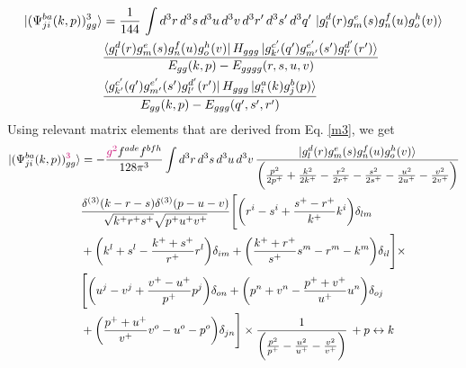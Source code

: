 \documentclass[a4paper,11pt]{article}
\begin{document}
\begin{figure}[htbp]
    \centering
\end{figure}
\begin{align}
     \ket{(\Psi^{ba}_{ji}(k,p))^{3}_{gg}} & =  \frac{1}{144}\, \int d^{3}r\, d^{3}s\, d^{3}u\, d^{3}v \, d^{3}r^{\prime}\, d^{3}s^{\prime} \, d^{3}q^{\prime}\, \ket{g^{d}_{l}(r)g^{e}_{m}(s)g^{f}_{n}(u)g^{h}_{o}(v)}\notag \\ & \frac{\bra{g^{d}_{l}(r)g^{e}_{m}(s)g^{f}_{n}(u)g^{h}_{o}(v)}H_{ggg}\ket{g^{c^{\prime}}_{k^{\prime}}(q^{\prime})g^{e^{\prime}}_{m^{\prime}}(s^{\prime})g^{d^{\prime}}_{l^{\prime}}(r^{\prime})}}{E_{gg}(k,p)-E_{gggg}(r,s,u,v)}\notag \\ &  \frac{\bra{g^{c^{\prime}}_{k^{\prime}}(q^{\prime})g^{e^{\prime}}_{m^{\prime}}(s^{\prime})g^{d^{\prime}}_{l^{\prime}}(r^{\prime})}H_{ggg}\ket{g^{a}_{i}(k)g^{b}_{j}(p)}}{E_{gg}(k,p)-E_{ggg}(q^{\prime},s^{\prime},r^{\prime})}
\end{align}
Using relevant matrix elements that are derived from Eq. \eqref{m3}, we get
\begin{align}
     \ket{(\Psi^{ba}_{ji}(k,p))^{{\color{chg}3}}_{gg}} & =  -\frac{{\color{chg}g^{2}}f^{ade}f^{bfh}}{128\pi^{3}} \int d^{3}r\, d^{3}s\, d^{3}u\,d^{3}v\, \frac{\ket{g^{d}_{l}(r)g^{e}_{m}(s)g^{f}_{n}(u)g^{h}_{o}(v)}}{\bigg(\frac{p^{2}}{2p^{+}}+\frac{k^{2}}{2k^{+}}-\frac{r^{2}}{2r^{+}}-\frac{s^{2}}{2s^{+}}-\frac{u^{2}}{2u^{+}}-\frac{v^{2}}{2v^{+}}\bigg)} \notag \\ & \frac{\delta^{(3)}(k-r-s)\delta^{(3)}(p-u-v)}{\sqrt{k^{+}r^{+}s^{+}}\sqrt{p^{+}u^{+}v^{+}}}\Bigg[\bigg(r^{i}-s^{i}+\frac{s^{+}-r^{+}}{k^{+}}k^{i}\bigg)\delta_{lm}\notag \\ & +\bigg(k^{l}+s^{l}-\frac{k^{+}+s^{+}}{r^{+}}r^{l}\bigg)\delta_{im} +\bigg(\frac{k^{+}+r^{+}}{s^{+}}s^{m}-r^{m}-k^{m}\bigg)\delta_{il}\Bigg]\times \notag \\ & \Bigg[\bigg(u^{j}-v^{j}+\frac{v^{+}-u^{+}}{p^{+}}p^{j}\bigg)\delta_{on}+\bigg(p^{n}+v^{n} -\frac{p^{+}+v^{+}}{u^{+}}u^{n}\bigg)\delta_{oj}\notag \\ & +\bigg(\frac{p^{+}+u^{+}}{v^{+}}v^{o}-u^{o}-p^{o}\bigg)\delta_{jn}\Bigg]\times \frac{1}{\bigg(\frac{p^{2}}{p^{+}}-\frac{u^{2}}{u^{+}}-\frac{v^{2}}{v^{+}}\bigg)}\,+ p\leftrightarrow k
\end{align}
\end{document}
